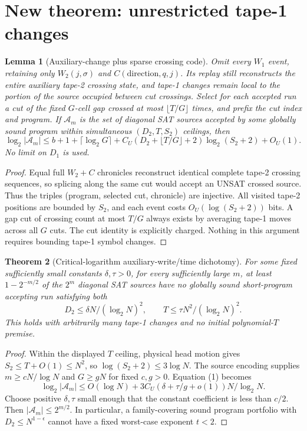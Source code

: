 \documentclass[11pt]{article}
\newtheorem{theorem}{Theorem}
\newtheorem{lemma}[theorem]{Lemma}
\begin{document}
\section*{New theorem: unrestricted tape-1 changes}
\begin{lemma}[Auxiliary-change plus sparse crossing code]
Omit every $W_1$ event, retaining only $W_2(j,\sigma)$ and $C(\mathrm{direction},q,j)$. Its replay still reconstructs the entire auxiliary tape-2 crossing state, and tape-1 changes remain local to the portion of the source occupied between cut crossings. Select for each accepted run a cut of the fixed $G$-cell gap crossed at most $\lfloor T/G\rfloor$ times, and prefix the cut index and program. If $\mathcal A_m$ is the set of diagonal SAT sources accepted by some globally sound program within simultaneous $(D_2,T,S_2)$ ceilings, then
\[
 \log_2|\mathcal A_m|
 \le b+1+\lceil\log_2G\rceil+
 C_U(D_2+\lfloor T/G\rfloor+2)\log_2(S_2+2)+O_U(1).
 \tag{1}
\]
No limit on $D_1$ is used.
\end{lemma}
\begin{proof}
Equal full $W_2+C$ chronicles reconstruct identical complete tape-2 crossing sequences, so splicing along the same cut would accept an UNSAT crossed source. Thus the triples (program, selected cut, chronicle) are injective. All visited tape-2 positions are bounded by $S_2$, and each event costs $O_U(\log(S_2+2))$ bits. A gap cut of crossing count at most $T/G$ always exists by averaging tape-1 moves across all $G$ cuts. The cut identity is explicitly charged. Nothing in this argument requires bounding tape-1 symbol changes.
\end{proof}
\begin{theorem}[Critical-logarithm auxiliary-write/time dichotomy]
For some fixed sufficiently small constants $\delta,\tau>0$, for every sufficiently large $m$, at least $1-2^{-m/2}$ of the $2^m$ diagonal SAT sources have \emph{no} globally sound short-program accepting run satisfying both
\[
 D_2\le\delta N/(\log_2N)^2,\qquad
 T\le\tau N^2/(\log_2N)^2.
\]
This holds with arbitrarily many tape-1 changes and no initial polynomial-$T$ premise.
\end{theorem}
\begin{proof}
Within the displayed $T$ ceiling, physical head motion gives $S_2\le T+O(1)\le N^2$, so $\log(S_2+2)\le3\log N$. The source encoding supplies $m\ge cN/\log N$ and $G\ge gN$ for fixed $c,g>0$. Equation (1) becomes
\[
 \log_2|\mathcal A_m|\le O(\log N)+
 3C_U(\delta+\tau/g+o(1))N/\log_2N.
\]
Choose positive $\delta,\tau$ small enough that the constant coefficient is less than $c/2$. Then $|\mathcal A_m|\le2^{m/2}$. In particular, a family-covering sound program portfolio with $D_2\le N^{1-\epsilon}$ cannot have a fixed worst-case exponent $t<2$.
\end{proof}
\end{document}
